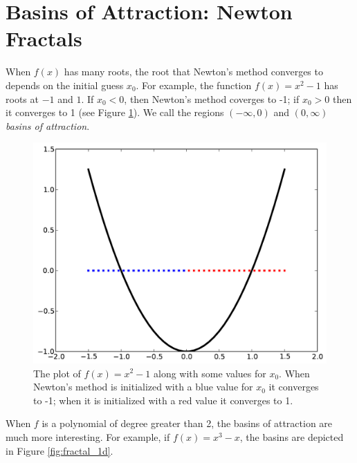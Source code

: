 \section*{Basins of Attraction: Newton Fractals} %

When $f(x)$ has many roots, the root that Newton's method converges to depends on the initial guess $x_0$.
For example, the function $f(x)=x^2-1$ has roots at $-1$ and $1$.
If $x_0<0$, then Newton's method coverges to -1; if $x_0>0$ then it converges to 1 (see Figure \ref{fig:basins1}).
We call the regions $(-\infty, 0)$ and $(0, \infty)$ \emph{basins of attraction}.

\begin{figure}
\begin{center}
\includegraphics[scale=0.5]{figures/basins1}
\caption{The plot of $f(x) = x^2 -1$ along with some values for $x_0$.
When Newton's method is initialized with a blue value for $x_0$ it converges to -1; when it is initialized with a red value it converges to 1.}
\label{fig:basins1}
\end{center}
\end{figure}

When $f$ is a polynomial of degree greater than 2, the basins of attraction are much more interesting.
For example, if $f(x) = x^3-x$, the basins are depicted in Figure \ref{fig:fractal_1d}.

